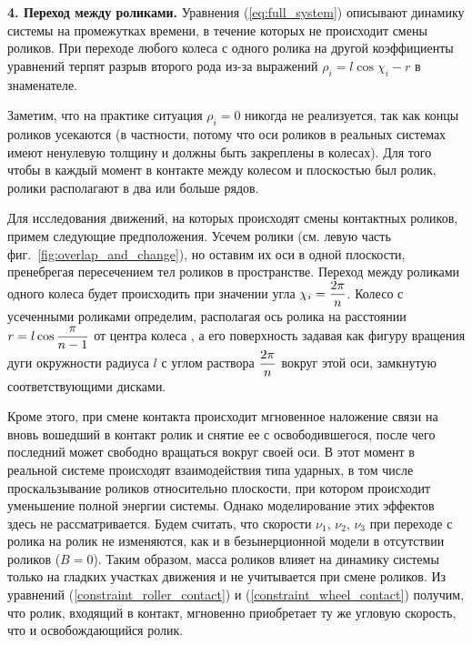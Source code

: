 {\bf 4. Переход между роликами.}
Уравнения (\ref{eq:full_system}) описывают динамику системы на промежутках времени, в течение которых не происходит смены роликов. 
При переходе любого колеса с одного ролика на другой коэффициенты уравнений терпят разрыв второго рода из-за выражений $\rho_i = l\cos\chi_i-r$ в знаменателе.


Заметим, что на практике ситуация $\rho_i = 0$ никогда не реализуется, так как концы роликов усекаются (в частности, потому что оси роликов в реальных системах имеют ненулевую толщину и должны быть закреплены в колесах). Для того чтобы в каждый момент в контакте между колесом и плоскостью был ролик, ролики располагают в два или больше рядов. %

Для исследования движений, на которых происходят смены контактных роликов, примем следующие предположения. Усечем ролики (см. левую часть фиг.~\ref{fig:overlap_and_change}), но оставим их оси в одной плоскости, пренебрегая пересечением тел роликов в пространстве. Переход между роликами одного колеса будет происходить при значении угла $\chi_i = \displaystyle\frac{\displaystyle 2\pi}{\displaystyle n}$. Колесо с усеченными роликами определим, располагая ось ролика на расстоянии $r = l\cos\displaystyle\frac{\displaystyle \pi}{\displaystyle n-1}$ от центра колеса
, а его поверхность задавая как фигуру вращения дуги окружности радиуса $l$ с углом раствора $\displaystyle\frac{\displaystyle 2\pi}{\displaystyle n}$ вокруг этой оси, замкнутую соответствующими дисками.

Кроме этого, при смене контакта происходит мгновенное наложение связи на вновь вошедший в контакт ролик и снятие ее с освободившегося, после чего последний может свободно вращаться вокруг своей оси. В этот момент в реальной системе происходят взаимодействия типа ударных, в том числе проскальзывание роликов относительно плоскости, при котором происходит уменьшение полной энергии системы. Однако моделирование этих эффектов здесь не рассматривается. Будем считать, что скорости $\nu_1$, $\nu_2$, $\nu_3$ при переходе с ролика на ролик не изменяются, как и в безынерционной модели в отсутствии роликов ($B = 0$).  Таким образом, масса роликов влияет на динамику системы только на гладких участках движения и не учитывается при смене роликов. Из уравнений (\ref{constraint_roller_contact}) и (\ref{constraint_wheel_contact}) получим, что ролик, входящий в контакт, мгновенно приобретает ту же угловую скорость, что и освобождающийся ролик.

